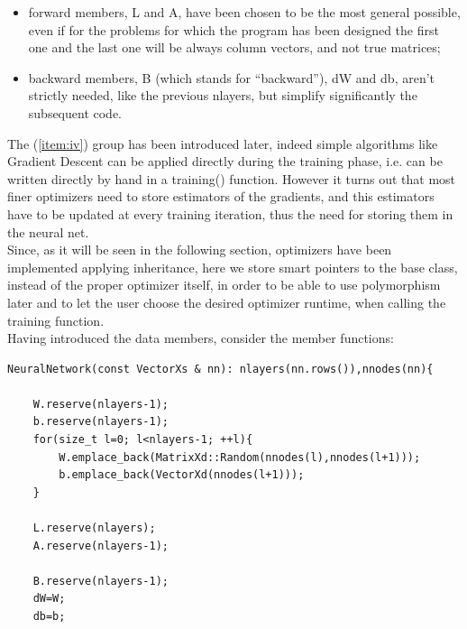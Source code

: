 \documentclass[12pt, a4paper]{report}
\theoremstyle{definition}
\begin{document}
{\begin{itemize}
	\item forward members, {\ttfamily L} and {\ttfamily A}, have been chosen to be the most general possible, even if for the problems for which the program has been designed the first one and the last one will be always column vectors, and not true matrices;
	\item backward members, {\ttfamily B} (which stands for ``backward''), {\ttfamily dW} and {\ttfamily db}, aren't strictly needed, like the previous {\ttfamily nlayers}, but simplify significantly the subsequent code.
\end{itemize}
The (\ref{item:iv}) group has been introduced later, indeed simple algorithms like Gradient Descent can be applied directly during the training phase, i.e. can be written directly by hand in a {\ttfamily training()} function. However it turns out that most finer optimizers need to store estimators of the gradients, and this estimators have to be updated at every training iteration, thus the need for storing them in the neural net.\\
Since, as it will be seen in the following section, optimizers have been implemented applying inheritance, here we store smart pointers to the base class, instead of the proper optimizer itself, in order to be able to use polymorphism later and to let the user choose the desired optimizer runtime, when calling the training function.\\
\newline \noindent
Having introduced the data members, consider the member functions:
\begin{lstlisting}[frame=single, showstringspaces=false]
NeuralNetwork(const VectorXs & nn): nlayers(nn.rows()),nnodes(nn){

	W.reserve(nlayers-1);
	b.reserve(nlayers-1);
	for(size_t l=0; l<nlayers-1; ++l){
		W.emplace_back(MatrixXd::Random(nnodes(l),nnodes(l+1)));	
		b.emplace_back(VectorXd(nnodes(l+1)));
	}

	L.reserve(nlayers);	
	A.reserve(nlayers-1);

	B.reserve(nlayers-1);	
	dW=W; 
	db=b; 


\end{lstlisting}}
\end{document}
